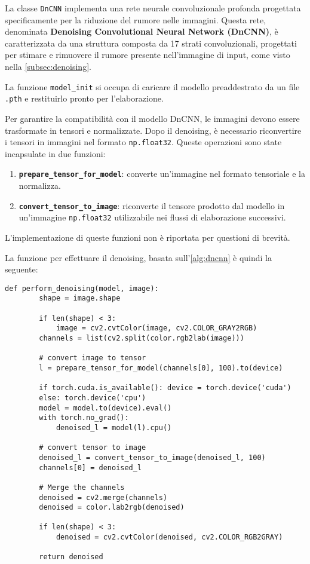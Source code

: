 La classe \texttt{DnCNN} implementa una rete neurale convoluzionale profonda progettata specificamente per la riduzione del rumore nelle immagini. Questa rete, denominata \textbf{Denoising Convolutional Neural Network (DnCNN)}, è caratterizzata da una struttura composta da 17 strati convoluzionali, progettati per stimare e rimuovere il rumore presente nell'immagine di input, come visto nella \cref{subsec:denoising}. 

La funzione \texttt{model\_init} si occupa di caricare il modello preaddestrato da un file \texttt{.pth} e restituirlo pronto per l'elaborazione.

Per garantire la compatibilità con il modello DnCNN, le immagini devono essere trasformate in tensori e normalizzate. Dopo il denoising, è necessario riconvertire i tensori in immagini nel formato \texttt{np.float32}. Queste operazioni sono state incapsulate in due funzioni:

\begin{enumerate}
    \item \textbf{\texttt{prepare\_tensor\_for\_model}}: converte un'immagine nel formato tensoriale e la normalizza.

    \item \textbf{\texttt{convert\_tensor\_to\_image}}: riconverte il tensore prodotto dal modello in un'immagine \texttt{np.float32} utilizzabile nei flussi di elaborazione successivi.
\end{enumerate}

L'implementazione di queste funzioni non è riportata per questioni di brevità.

La funzione per effettuare il denoising, basata sull'\cref{alg:dncnn} è quindi la seguente:

\begin{lstlisting}[label={lst:denoise}]
    def perform_denoising(model, image):
        shape = image.shape

        if len(shape) < 3:
            image = cv2.cvtColor(image, cv2.COLOR_GRAY2RGB)
        channels = list(cv2.split(color.rgb2lab(image)))
        
        # convert image to tensor
        l = prepare_tensor_for_model(channels[0], 100).to(device)
        
        if torch.cuda.is_available(): device = torch.device('cuda')
        else: torch.device('cpu')
        model = model.to(device).eval()
        with torch.no_grad():
            denoised_l = model(l).cpu()

        # convert tensor to image
        denoised_l = convert_tensor_to_image(denoised_l, 100)
        channels[0] = denoised_l

        # Merge the channels
        denoised = cv2.merge(channels)
        denoised = color.lab2rgb(denoised)

        if len(shape) < 3:
            denoised = cv2.cvtColor(denoised, cv2.COLOR_RGB2GRAY)

        return denoised
\end{lstlisting}

